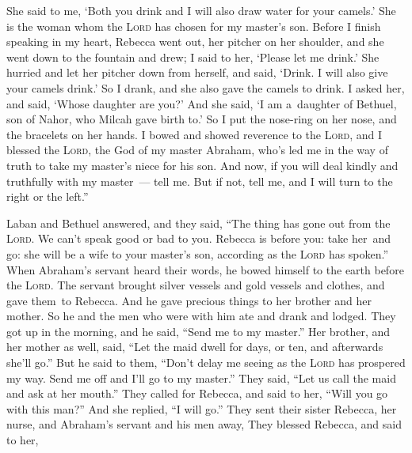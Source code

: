 \begin{inparaenum}
   She said to me, `Both you drink and I will also draw water for your camels.' She is the woman whom the \textsc{Lord} has chosen for my master's son.%
   Before I finish speaking in my heart, Rebecca went out, her pitcher on her shoulder, and she went down to the fountain and drew; I said to her, `Please let me drink.'%
   She hurried and let her pitcher down from herself, and said, `Drink. I will also give your camels drink.' So I drank, and she also gave the camels to drink.%
   I asked her, and said, `Whose daughter are you?' And she said, `I am a\understood\ daughter of Bethuel, son of Nahor, who Milcah gave birth to.' So I put the nose-ring on her nose, and the bracelets on her hands.%
   I bowed and showed reverence to the \textsc{Lord}, and I blessed the \textsc{Lord}, the God of my master Abraham, who's led me in the way of truth to take my master's niece for his son.%
   And now, if you will deal kindly and truthfully with my master~--- tell me. But if not, tell me, and I will turn to the right or the left.''%
  
   Laban and Bethuel answered, and they said, ``The thing has gone out from the \textsc{Lord}. We can't speak good or bad to you.%
   Rebecca is before you: take her\understood\ and go: she will be a wife to your master's son, according as the \textsc{Lord} has spoken.''%
   When Abraham's servant heard their words, he bowed himself to the earth before the \textsc{Lord}.%
   The servant brought silver vessels and gold vessels and clothes, and gave them\understood\ to Rebecca. And he gave precious things to her brother and her mother.%
   So he and the men who were with him ate and drank and lodged. They got up in the morning, and he said, ``Send me to my master.''%
   Her brother, and her mother as well, said, ``Let the maid dwell for days, or ten, and afterwards she'll go.''%
   But he said to them, ``Don't delay me seeing as the \textsc{Lord} has prospered my way. Send me off and I'll go to my master.''%
   They said, ``Let us call the maid and ask at her mouth.''%
   They called for Rebecca, and said to her, ``Will you go with this man?'' And she replied, ``I will go.''%
   They sent their sister Rebecca, her nurse, and Abraham's servant and his men away,%
   They blessed Rebecca, and said to her,\smallskip%
  

\end{inparaenum}
